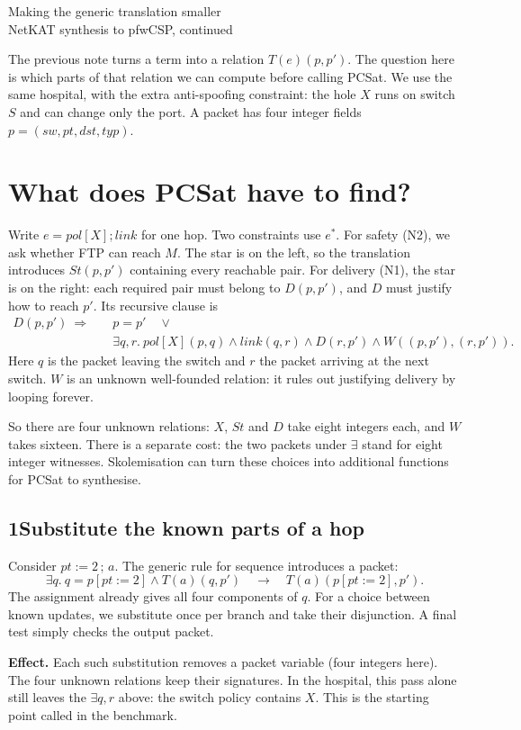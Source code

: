 \documentclass[11pt,a4paper]{article}
\newcommand{\pass}[2]{\subsection*{#1\quad #2}}
\newcommand{\code}[1]{\texttt{\detokenize{#1}}}
\begin{document}
\begin{center}
{\LARGE Making the generic translation smaller}\\[5pt]
{\large NetKAT synthesis to pfwCSP, continued}
\end{center}

The previous note turns a term into a relation $T(e)(p,p')$. The question here is
which parts of that relation we can compute before calling PCSat. We use the
same hospital, with the extra anti-spoofing constraint: the hole $X$ runs on
switch $S$ and can change only the port. A packet has four integer fields
$p=(sw,pt,dst,typ)$.

\section*{What does PCSat have to find?}
Write $e=\mathit{pol}[X];\mathit{link}$ for one hop. Two constraints use $e^*$.
For safety (N2), we ask whether FTP can reach $M$. The star is on the left, so
the translation introduces $St(p,p')$ containing every reachable pair.
For delivery (N1), the star is on the right: each required pair must belong
to $D(p,p')$, and $D$ must justify how to reach $p'$. Its recursive clause is
\[
\begin{aligned}
D(p,p')\ \Longrightarrow\quad &p=p'\quad\lor\\
 &\exists q,r.\ \mathit{pol}[X](p,q)\land\mathit{link}(q,r)\land D(r,p')
                       \land W((p,p'),(r,p')) .
\end{aligned}
\]
Here $q$ is the packet leaving the switch and $r$ the packet arriving at the
next switch. $W$ is an unknown well-founded relation: it rules out justifying
delivery by looping forever.

So there are four unknown relations: $X$, $St$ and $D$ take eight integers each,
and $W$ takes sixteen. There is a separate cost: the two packets under
$\exists$ stand for eight integer witnesses. Skolemisation can turn these
choices into additional functions for PCSat to synthesise.

\pass{1}{Substitute the known parts of a hop}
Consider $pt:=2\,;\,a$. The generic rule for sequence introduces a packet:
\[
  \exists q.\ q=p[pt:=2]\land T(a)(q,p')
  \quad\longrightarrow\quad T(a)(p[pt:=2],p').
\]
The assignment already gives all four components of $q$. For a choice
between known updates, we substitute once per branch and take their
disjunction. A final test simply checks the output packet.

\textbf{Effect.} Each such substitution removes a packet variable (four
integers here). The four unknown relations keep their signatures. In the
hospital, this pass alone still leaves the $\exists q,r$ above: the switch
policy contains $X$. This is the starting point called \code{generic} in the
benchmark.
\end{document}

